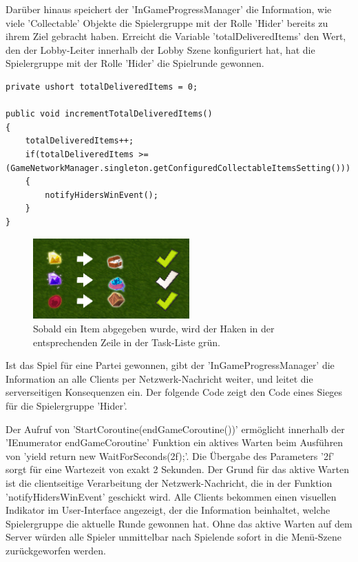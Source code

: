 Darüber hinaus speichert der 'InGameProgressManager' die Information, wie viele 'Collectable' Objekte die Spielergruppe mit der Rolle 'Hider' bereits zu ihrem Ziel gebracht haben. Erreicht die Variable 'totalDeliveredItems' den Wert, den der Lobby-Leiter innerhalb der Lobby Szene konfiguriert hat, hat die Spielergruppe mit der Rolle 'Hider' die Spielrunde gewonnen.

\begin{lstlisting}[caption= InGameProgressManager.cs Item Devlivery Handling]
private ushort totalDeliveredItems = 0;

public void incrementTotalDeliveredItems()
{
	totalDeliveredItems++;
	if(totalDeliveredItems >= (GameNetworkManager.singleton.getConfiguredCollectableItemsSetting()))
	{
		notifyHidersWinEvent();
	}
}	
\end{lstlisting}

\begin{figure}[H]
	\centering
	\includegraphics[width=60mm]{images/prototyp_task_list_progress.png}
	\caption[Updated Task List]{Sobald ein Item abgegeben wurde, wird der Haken in der entsprechenden Zeile in der Task-Liste grün.}
	\label{pic:prototyp_task_list_progress}
\end{figure}

Ist das Spiel für eine Partei gewonnen, gibt der 'InGameProgressManager' die Information an alle Clients per Netzwerk-Nachricht weiter, und leitet die serverseitigen Konsequenzen ein. Der folgende Code zeigt den Code eines Sieges für die Spielergruppe 'Hider'. 

Der Aufruf von 'StartCoroutine(endGameCoroutine())' ermöglicht innerhalb der 'IEnumerator endGameCoroutine' Funktion ein aktives Warten beim Ausführen von 'yield return new WaitForSeconds(2f);'. Die Übergabe des Parameters '2f' sorgt für eine Wartezeit von exakt 2 Sekunden. Der Grund für das aktive Warten ist die clientseitige Verarbeitung der Netzwerk-Nachricht, die in der Funktion 'notifyHidersWinEvent' geschickt wird. Alle Clients bekommen einen visuellen Indikator im User-Interface angezeigt, der die Information beinhaltet, welche Spielergruppe die aktuelle Runde gewonnen hat. Ohne das aktive Warten auf dem Server würden alle Spieler unmittelbar nach Spielende sofort in die Menü-Szene zurückgeworfen werden.


